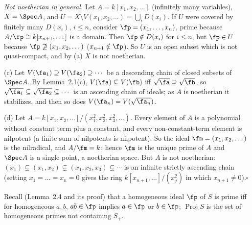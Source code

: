 \documentclass[11pt]{article}
\begin{document}
\emph{Not noetherian in general.} Let $A=k[x_1,x_2,\dots]$ (infinitely many variables), $X=\Spec A$, and $U=X\setminus V(x_1,x_2,\dots)=\bigcup_iD(x_i)$. If $U$ were covered by finitely many $D(x_i)$, $i\le n$, consider $\fp=(x_1,\dots,x_n)$, prime because $A/\fp\cong k[x_{n+1},\dots]$ is a domain. Then $\fp\notin D(x_i)$ for $i\le n$, but $\fp\in U$ because $\fp\not\supseteq(x_1,x_2,\dots)$ ($x_{n+1}\notin\fp$). So $U$ is an open subset which is not quasi-compact, and by (a) $X$ is not noetherian.

(c) Let $V(\fa_1)\supseteq V(\fa_2)\supseteq\cdots$ be a descending chain of closed subsets of $\Spec A$. By Lemma~2.1(c), $V(\fa)\subseteq V(\fb)$ iff $\sqrt\fa\supseteq\sqrt\fb$, so $\sqrt{\fa_1}\subseteq\sqrt{\fa_2}\subseteq\cdots$ is an ascending chain of ideals; as $A$ is noetherian it stabilizes, and then so does $V(\fa_n)=V(\sqrt{\fa_n})$.

(d) Let $A=k[x_1,x_2,\dots]/(x_1^2,x_2^2,x_3^2,\dots)$. Every element of $A$ is a polynomial without constant term plus a constant, and every non-constant-term element is nilpotent (a finite sum of nilpotents is nilpotent). So the ideal $\fm=(x_1,x_2,\dots)$ is the nilradical, and $A/\fm=k$; hence $\fm$ is the unique prime of $A$ and $\Spec A$ is a single point, a noetherian space. But $A$ is not noetherian: $(x_1)\subsetneq(x_1,x_2)\subsetneq(x_1,x_2,x_3)\subsetneq\cdots$ is an infinite strictly ascending chain (setting $x_1=\dots=x_n=0$ gives the ring $k[x_{n+1},\dots]/(x_{j}^2)$ in which $x_{n+1}\ne0$).\hfill$\square$

\pf
Recall (Lemma~2.4 and its proof) that a homogeneous ideal $\fp$ of $S$ is prime iff for homogeneous $a,b$, $ab\in\fp$ implies $a\in\fp$ or $b\in\fp$; $\operatorname{Proj}S$ is the set of homogeneous primes not containing $S_+$.
\end{document}
